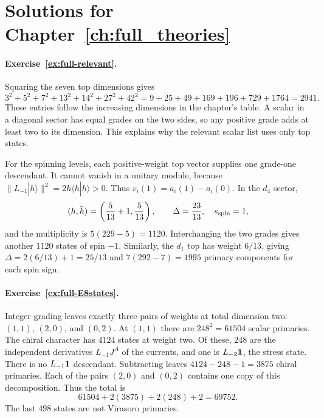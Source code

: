 \section{Solutions for Chapter~\ref{ch:full_theories}}

\paragraph{Exercise~\ref{ex:full-relevant}.}
\label{sol:ex:full-relevant}
Squaring the seven top dimensions gives
\[
 3^2+5^2+7^2+13^2+14^2+27^2+42^2
 =9+25+49+169+196+729+1764=2941.
\]
These entries follow the increasing dimensions in the chapter's
table. A scalar in a diagonal sector has equal grades on the two
sides, so any positive grade adds at least two to its dimension.
This explains why the relevant scalar list uses only top states.

For the spinning levels, each positive-weight top vector supplies
one grade-one descendant. It cannot vanish in a unitary module,
because $\|L_{-1}|h\rangle\|^2=2h\langle h|h\rangle>0$.
Thus $v_i(1)=a_i(1)-a_i(0)$. In the $d_4$ sector,
\[
 (h,\bar h)=\left(\frac5{13}+1,\frac5{13}\right),
 \qquad \Delta=\frac{23}{13},\quad s_{\rm spin}=1,
\]
and the multiplicity is $5(229-5)=1120$.
Interchanging the two grades gives another $1120$ states of
spin $-1$. Similarly, the $d_1$ top has weight $6/13$, giving
$\Delta=2(6/13)+1=25/13$ and $7(292-7)=1995$ primary
components for each spin sign.



\paragraph{Exercise~\ref{ex:full-E8states}.}
\label{sol:ex:full-E8states}
Integer grading leaves exactly three pairs of weights at total
dimension two: $(1,1)$, $(2,0)$, and $(0,2)$.
At $(1,1)$ there are $248^2=61504$ scalar primaries.
The chiral character has $4124$ states at weight two.
Of these, $248$ are the independent derivatives $L_{-1}J^A$
of the currents, and one is $L_{-2}\mathbf1$, the stress state.
There is no $L_{-1}\mathbf1$ descendant. Subtracting leaves
$4124-248-1=3875$ chiral primaries. Each of the pairs
$(2,0)$ and $(0,2)$ contains one copy of this decomposition.
Thus the total is
\[
 61504+2(3875)+2(248)+2=69752.
\]
The last $498$ states are not Virasoro primaries.



